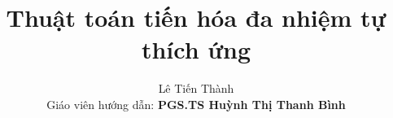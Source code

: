 \title{\textbf{Thuật toán tiến hóa đa nhiệm tự thích ứng}}
\author{Lê Tiến Thành\\ Giáo viên hướng dẫn: \textbf{PGS.TS Huỳnh Thị Thanh Bình}}
\date{}